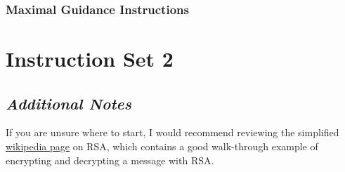         \subsubsection{Maximal Guidance Instructions}
            {\parindent0pt\singlespacing
                \section*{Instruction Set 2}
                    \subsection*{\textit{Additional Notes}}
                        If you are unsure where to start, I would recommend reviewing the simplified \href{https://simple.wikipedia.org/wiki/RSA_algorithm}{wikipedia page} on RSA, which contains a good walk-through example of encrypting and decrypting a message with RSA.

}
